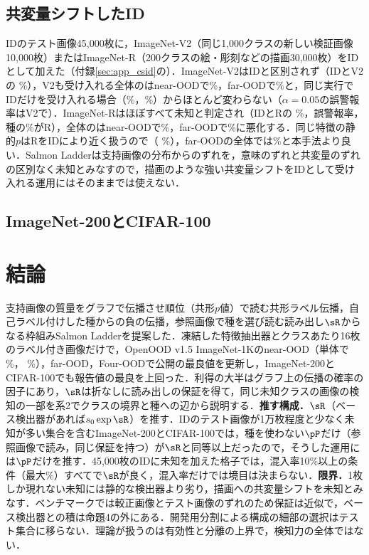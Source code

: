 \subsection{共変量シフトしたID}
\label{sec:csid}
IDのテスト画像45,000枚に，ImageNet-V2（同じ1,000クラスの新しい検証画像10,000枚）またはImageNet-R（200クラスの絵・彫刻などの描画30,000枚）をIDとして加えた（付録\ref{sec:app_csid}の）．ImageNet-V2はIDと区別されず（IDとV2の\AUC{} \NRCsVTwoNearRefIcAuroc\%），V2も受け入れる全体の\FPR{}はnear-OODで\NRCsVTwoNearRefFsFpr\%，far-OODで\NRCsVTwoFarRefFsFpr\%と，同じ実行でIDだけを受け入れる場合（\NRCsVTwoNearRefIoFpr\%，\NRCsVTwoFarRefIoFpr\%）からほとんど変わらない（$\alpha{=}0.05$の誤警報率はV2で\NRCsVTwoNearFprCsFive{}）．ImageNet-Rはほぼすべて未知と判定され（IDとRの\AUC{} \NRCsRNearRefIcAuroc\%，誤警報率\NRCsRNearFprCsFive{}，種の\NRCsRNearSeedShare\%がR），全体の\FPR{}はnear-OODで\NRCsRNearRefFsFpr\%，far-OODで\NRCsRFarRefFsFpr\%に悪化する．同じ特徴の静的$p$はRをIDにより近く扱うので（\AUC{} \NRCsRNearStaticIcAuroc\%），far-OODの全体では\NRCsRFarStaticFsFpr\%と本手法より良い．Salmon Ladderは支持画像の分布からのずれを，意味のずれと共変量のずれの区別なく未知とみなすので，描画のような強い共変量シフトをIDとして受け入れる運用にはそのままでは使えない．

\subsection{ImageNet-200とCIFAR-100}
\label{sec:in200}


\section{結論}
支持画像の質量をグラフで伝播させ順位（共形$p$値）で読む共形ラベル伝播，自己ラベル付けした種からの負の伝播，参照画像で種を選び読む読み出し$\sR$からなる枠組みSalmon Ladderを提案した．凍結した特徴抽出器とクラスあたり16枚のラベル付き画像だけで，OpenOOD v1.5 ImageNet-1Kのnear-OOD（単体で\AUC{} \NRAloneNearAuroc\%，\FPR{} \NRAloneNearFpr\%），far-OOD，Four-OODで公開の最良値を更新し，ImageNet-200とCIFAR-100でも報告値の最良を上回った．利得の大半はグラフ上の伝播の確率の因子にあり，$\sR$は折なしに読み出しの保証を得て，同じ未知クラスの画像の検知の一部を系2でクラスの境界と種への辺から説明する．\textbf{推す構成．}$\sR$（ベース検出器があれば$s_0\exp\sR$）を推す．IDのテスト画像が1万枚程度と少なく未知が多い集合を含むImageNet-200とCIFAR-100では，種を使わない$\pP$だけ（参照画像で読み，同じ保証を持つ）が$\sR$と同等以上だったので，そうした運用には$\pP$だけを推す．45,000枚のIDに未知を加えた格子では，混入率10\%以上の\NRRecHiMixN{}条件（最大\NRRecHiMixMax\%）すべてで$\sR$が良く，混入率だけでは境目は決まらない．\textbf{限界．}1枚しか現れない未知には静的な検出器より劣り，描画への共変量シフトを未知とみなす．ベンチマークでは較正画像とテスト画像のずれのため保証は近似で，ベース検出器との積は命題4の外にある．開発用分割による構成の細部の選択はテスト集合に移らない．理論が扱うのは有効性と分離の上界で，検知力の全体ではない．


